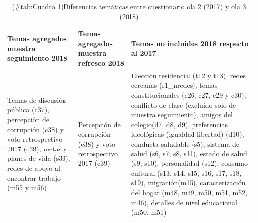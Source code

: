 \documentclass[
  openany]{book}
\begin{document}
\begin{table}[H]

\caption{(\#tab:Cuadro 1)\label{tab:difcuest}Diferencias temáticas entre cuestionario ola 2 (2017) y ola 3 (2018)}
\centering
\begin{tabular}[t]{>{\raggedright\arraybackslash}p{6cm}>{\raggedright\arraybackslash}p{6cm}l}
\toprule
Temas agregados muestra seguimiento 2018 & Temas agregados muestra refresco 2018 & Temas no incluidos 2018 respecto al 2017\\
\midrule
Temas de discusión pública (c37), percepción de corrupción (c38) y voto retrospectivo 2017
                              (c39), metas y planes de vida (s30), redes de apoyo al encontrar trabajo (m55 y m56) & Percepción de corrupción (c38) y voto retrospectivo 2017 (c39) & Elección residencial (t12 y t13), redes cercanas (r1\_nredes), temas constitucionales (c26,
                              c27, c29 y c30), conflicto de clase (excluido solo de muestra seguimiento), amigos del
                              colegio(d7, d8, d9), preferencias ideológicas (igualdad-libertad) (d10), conducta saludable
                              (s5), sistema de salud (s6, s7, s8, s11), estado de salud (s9, s10), personalidad (s12),
                              consumo cultural (s13, s14, s15, s16, s17, s18, s19), migración(m15), caracterización del
                              hogar (m48, m49, m50, m51, m52, m46), detalles de nivel educacional (m50, m51)\\
\bottomrule
\end{tabular}
\end{table}
\end{document}
